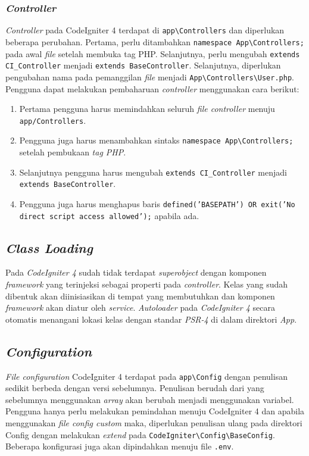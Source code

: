 \subsubsection{\textit{Controller}}
\textit{Controller} pada CodeIgniter 4 terdapat di \verb|app\Controllers| dan diperlukan beberapa perubahan. Pertama, perlu ditambahkan \verb|namespace App\Controllers;| pada awal \textit{file} setelah membuka tag PHP. Selanjutnya, perlu mengubah \verb|extends CI_Controller| menjadi \verb|extends BaseController|. Selanjutnya, diperlukan pengubahan nama pada pemanggilan \textit{file} menjadi \verb|App\Controllers\User.php|. Pengguna dapat melakukan pembaharuan \textit{controller} menggunakan cara berikut:
\begin{enumerate}
\item Pertama pengguna harus memindahkan seluruh \textit{file controller} menuju \verb|app/Controllers|.
\item Pengguna juga harus menambahkan sintaks \verb|namespace App\Controllers;| setelah pembukaan \textit{tag PHP}.
\item Selanjutnya pengguna harus mengubah \verb|extends CI_Controller| menjadi \verb|extends BaseController|.
\item Pengguna juga harus menghapus baris \texttt{defined('BASEPATH') OR exit('No direct script access allowed');} apabila ada.
\end{enumerate}
 
\subsection{\textit{Class Loading}}
Pada \textit{CodeIgniter 4} sudah tidak terdapat \textit{superobject} dengan komponen \textit{framework} yang terinjeksi sebagai properti pada \textit{controller}. Kelas yang sudah dibentuk akan diinisiasikan di tempat yang membutuhkan dan komponen \textit{framework} akan diatur oleh \textit{service}. \textit{Autoloader} pada \textit{CodeIgniter 4} secara otomatis menangani lokasi kelas dengan standar \textit{PSR-4} di dalam direktori \textit{App}.
 
\subsection{\textit{Configuration}}

\textit{File configuration} CodeIgniter 4 terdapat pada \verb|app\Config| dengan penulisan sedikit berbeda dengan versi sebelumnya. Penulisan berudah dari yang sebelumnya menggunakan \textit{array} akan berubah menjadi menggunakan variabel. Pengguna hanya perlu melakukan pemindahan menuju CodeIgniter 4 dan apabila menggunakan \textit{file config custom} maka, diperlukan penulisan ulang pada direktori Config dengan melakukan \textit{extend} pada \verb|CodeIgniter\Config\BaseConfig|. Beberapa konfigurasi juga akan dipindahkan menuju file \texttt{.env}.

